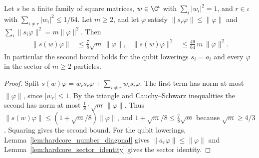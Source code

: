 \begin{lemma}
    \label{lem:hardcore_mode_bound}
    \leanok
    Let $s$ be a finite family of square matrices, $w\in\C^\iota$ with
    $\sum_i|w_i|^2=1$, and $r\in\iota$ with $\sum_{i\neq r}|w_i|^2\le1/64$. Let $m\ge2$,
    and let $\varphi$ satisfy $\lVert s_r\varphi\rVert\le\lVert\varphi\rVert$ and
    $\sum_i\lVert s_i\varphi\rVert^2=m\lVert\varphi\rVert^2$. Then
    \begin{align*}
        \lVert s(w)\varphi\rVert   & \le\tfrac78\sqrt m\,\lVert\varphi\rVert,      &
        \lVert s(w)\varphi\rVert^2 & \le\tfrac{49}{64}\,m\,\lVert\varphi\rVert^2 .
    \end{align*}
    In particular the second bound holds for the qubit lowerings $s_i=a_i$ and every
    $\varphi$ in the sector of $m\ge2$ particles.
\end{lemma}
\begin{proof}\leanok
    Split $s(w)\varphi=w_rs_r\varphi+\sum_{i\neq r}w_is_i\varphi$. The first term has
    norm at most $\lVert\varphi\rVert$, since $|w_r|\le1$. By the triangle and
    Cauchy--Schwarz inequalities the second has norm at most
    $\tfrac18\cdot\sqrt m\,\lVert\varphi\rVert$. Thus
    $\lVert s(w)\varphi\rVert\le(1+\sqrt m/8)\lVert\varphi\rVert$, and
    $1+\sqrt m/8\le\tfrac78\sqrt m$ because $\sqrt m\ge4/3$. Squaring gives the second
    bound. For the qubit lowerings, Lemma~\ref{lem:hardcore_number_diagonal} gives
    $\lVert a_r\varphi\rVert\le\lVert\varphi\rVert$ and
    Lemma~\ref{lem:hardcore_sector_identity} gives the sector identity.
\end{proof}


